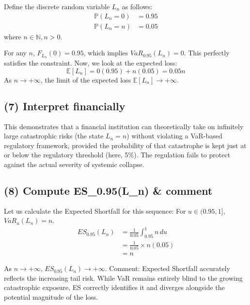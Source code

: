 Define the discrete random variable $L_n$ as follows:
\begin{align*}
\mathbb{P}(L_n = 0) &= 0.95 \\
\mathbb{P}(L_n = n) &= 0.05
\end{align*}
where $n \in \mathbb{N}, n > 0$.

For any $n$, $F_{L_n}(0) = 0.95$, which implies $VaR_{0.95}(L_n) = 0$. This perfectly satisfies the constraint.
Now, we look at the expected loss:
\begin{equation*}
\mathbb{E}[L_n] = 0(0.95) + n(0.05) = 0.05n
\end{equation*}
As $n \rightarrow +\infty$, the limit of the expected loss $\mathbb{E}[L_n] \rightarrow +\infty$.


\subsection{(7) Interpret financially}

This demonstrates that a financial institution can theoretically take on infinitely large catastrophic risks (the state $L_n = n$) without violating a VaR-based regulatory framework, provided the probability of that catastrophe is kept just at or below the regulatory threshold (here, 5\%). The regulation fails to protect against the actual severity of systemic collapse.


\subsection{(8) Compute ES\_0.95(L\_n) \& comment}

Let us calculate the Expected Shortfall for this sequence:
For $u \in (0.95, 1]$, $VaR_u(L_n) = n$.
\begin{align*}
ES_{0.95}(L_n) &= \frac{1}{0.05} \int_{0.95}^1 n \, du \\
&= \frac{1}{0.05} \times n(0.05) \\
&= n
\end{align*}

As $n \rightarrow +\infty$, $ES_{0.95}(L_n) \rightarrow +\infty$. 
Comment: Expected Shortfall accurately reflects the increasing tail risk. While VaR remains entirely blind to the growing catastrophic exposure, ES correctly identifies it and diverges alongside the potential magnitude of the loss.